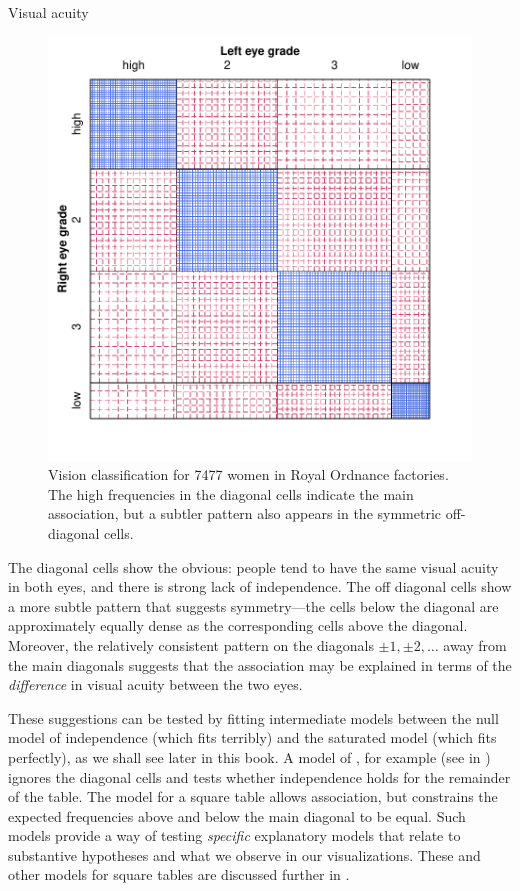 \documentclass[10pt,krantz2]{krantz}\usepackage[]{graphicx}\usepackage[]{color}
\newenvironment{knitrout}{}{} %
\renewenvironment{knitrout}{\small\renewcommand{\baselinestretch}{.85}}{} %
\begin{document}
\begin{Example}[vision1]{Visual acuity}
\begin{knitrout}
\begin{figure}[!htbp]
\centerline{\includegraphics[width=.7\textwidth]{ch04/fig/VA-sieve2-1} }

\caption[Vision classification for 7477 women in Royal Ordnance factories]{Vision classification for 7477 women in Royal Ordnance factories. The high frequencies in the diagonal cells indicate the main association, but a subtler pattern also appears in the symmetric off-diagonal cells.\label{fig:VA-sieve2}}
\end{figure}


\end{knitrout}

The diagonal cells show the obvious:
people tend to have the same visual acuity in both eyes, and there is
strong lack of independence.  The off diagonal cells show a more subtle
pattern that suggests symmetry---the cells below the diagonal
are approximately equally dense as the corresponding cells above the diagonal.
Moreover, the relatively consistent pattern on the diagonals
$\pm 1, \pm 2, \dots$ away from the main diagonals suggests
that the association may be explained in terms of the \emph{difference}
in visual acuity between the two eyes.

These suggestions can be tested by fitting  intermediate models
between the null model of independence (which fits terribly)
and the saturated model (which fits perfectly),
as we shall see later in this book.
A model of , for example
(see  in )
ignores the diagonal cells and tests whether independence holds
for the remainder of the table.
The  model for a square table allows association,
but constrains the expected frequencies above and below the
main diagonal to be equal.
Such models provide a
way of testing \emph{specific} explanatory models that relate to
substantive hypotheses and what we observe in our visualizations.
These and other models for square tables
are discussed further in .
\end{Example}
\end{document}
